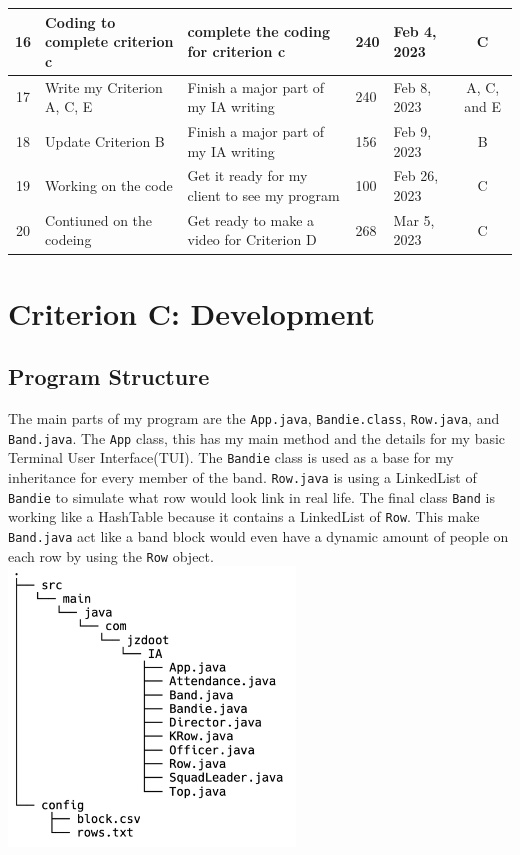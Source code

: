 \documentclass{article}
\begin{document}
{\begin{tabular}{| c | p{1.5in} | p{1.5in} | p{1in} | p{1in} | c |}
		\hline
		16 & Coding to complete criterion c & complete the coding for criterion c & 240 & Feb 4, 2023 & C\\
		\hline
		17 & Write my Criterion A, C, E & Finish a major part of my IA writing & 240 & Feb 8, 2023 & A, C, and E\\
		\hline
		18 & Update Criterion B & Finish a major part of my IA writing &  156 & Feb 9, 2023 & B\\
		\hline
		19 & Working on the code & Get it ready for my client to see my program & 100 & Feb 26, 2023 & C\\
		\hline
		20 & Contiuned on the codeing & Get ready to make a video for Criterion D & 268 & Mar 5, 2023 & C\\
		\hline
	\end{tabular}
}
\newpage
\section{Criterion C: Development}
\subsection{Program Structure}
The main parts of my program are the \verb|App.java|, \verb|Bandie.class|, \verb|Row.java|, and \verb|Band.java|. The \verb|App| class, this has my main method and the details for my basic Terminal User Interface(TUI). The \verb|Bandie| class is used as a base for my inheritance for every member of the band. \verb|Row.java| is using a LinkedList of \verb|Bandie| to simulate what row would look link in real life. The final class \verb|Band| is working like a HashTable because it contains a LinkedList of \verb|Row|. This make \verb|Band.java| act like a band block would even have a dynamic amount of people on each row by using the \verb|Row| object.\\
\includegraphics[width=3in]{fileStructure.png}
\end{document}
